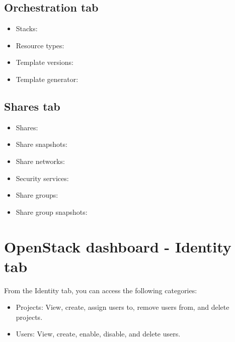 \subsection*{\texorpdfstring{Orchestration
tab}{Orchestration tab}}\label{orchestration-tab}

\begin{itemize}
\item
  Stacks:
\item
  Resource types:
\item
  Template versions:
\item
  Template generator:
\end{itemize}

\subsection*{\texorpdfstring{Shares
tab}{Shares tab}}\label{shares-tab}

\begin{itemize}
\item
  Shares:
\item
  Share snapshots:
\item
  Share networks:
\item
  Security services:
\item
  Share groups:
\item
  Share group snapshots:
\end{itemize}

\section*{OpenStack dashboard - Identity
tab}\label{openstack-dashboard---identity-tab}

From the Identity tab, you can access the following categories:

\begin{itemize}
\item
  Projects: View, create, assign users to, remove users from, and delete
  projects.
\item
  Users: View, create, enable, disable, and delete users.
\end{itemize}

